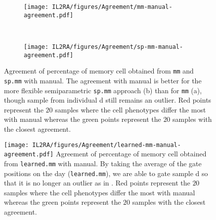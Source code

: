\begin{figure}[h]
    \begin{subfigure}[b]{.5\textwidth}
        \centering
        \texttt{[image: IL2RA/figures/Agreement/mm-manual-agreement.pdf]}
       \caption{ }
        \label{figure:mm-manual-agreement}
    \end{subfigure}
    ~
    \begin{subfigure}[b]{.5\textwidth}
       \texttt{[image: IL2RA/figures/Agreement/sp-mm-manual-agreement.pdf]}
       \caption{ }
        \label{figure:sp-mm-manual-agreement}
    \end{subfigure}
    {Agreement of percentage of memory cell obtained from \texttt{mm} and \texttt{sp.mm} with manual.}
    {
    The agreement with manual is better for the more flexible semiparametric \texttt{sp.mm} approach (b) than for \texttt{mm} (a),
    though sample from individual d still remains an outlier.
    Red points represent the $20$ samples where the cell phenotypes differ the most with manual 
    whereas the green points represent the $20$ samples with the closest agreement.
    }
\end{figure} 

\begin{figure}[h]
 \centering
 \texttt{[image: IL2RA/figures/Agreement/learned-mm-manual-agreement.pdf]}
 {Agreement of percentage of memory cell obtained from \texttt{learned.mm} with manual.}
 {
 By taking the average of the gate positions on the day (\texttt{learned.mm}), we are able to gate sample d so that it is no longer an outlier
 as in .
 Red points represent the $20$ samples where the cell phenotypes differ the most with manual 
 whereas the green points represent the $20$ samples with the closest agreement.
  }
\end{figure} 

